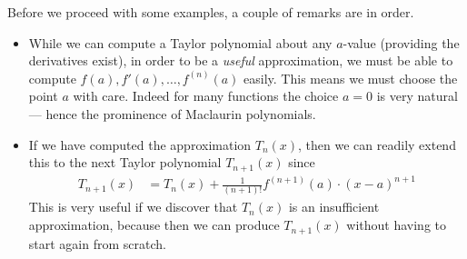 Before we proceed with some examples, a couple of remarks are in order.
\begin{itemize}
 \item While we can compute a Taylor polynomial about any $a$-value (providing the
derivatives exist), in order to be a \emph{useful} approximation, we must be able to
compute $f(a),f'(a),\dots,f^{(n)}(a)$ easily. This means we must choose the point $a$
with care. Indeed for many functions the choice $a=0$ is very natural --- hence the
prominence of Maclaurin polynomials.

\item If we have computed the approximation $T_n(x)$, then we can readily
extend this to the next Taylor polynomial $T_{n+1}(x)$ since
\begin{align*}
  T_{n+1}(x) &= T_n(x) + \frac{1}{(n+1)!} f^{(n+1)}(a) \cdot (x-a)^{n+1}
\end{align*}
This is very useful if we discover that $T_n(x)$ is an insufficient
approximation, because then we can produce $T_{n+1}(x)$ without having to start
again from scratch.
\end{itemize}

